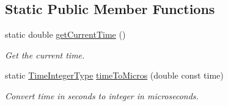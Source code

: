 \subsection*{Static Public Member Functions}
\begin{DoxyCompactItemize}
\item 
static double \hyperlink{structvt_1_1trace_1_1_trace_lite_ad1d8159d645a3b7047ce3f2e0c080f8d}{get\+Current\+Time} ()
\begin{DoxyCompactList}\small\item\em Get the current time. \end{DoxyCompactList}\item 
static \hyperlink{structvt_1_1trace_1_1_trace_lite_a301955b0e2e8d76ca5974c10be8125c4}{Time\+Integer\+Type} \hyperlink{structvt_1_1trace_1_1_trace_lite_a54f5dd2119d3de0bb5df60d7986ea7aa}{time\+To\+Micros} (double const time)
\begin{DoxyCompactList}\small\item\em Convert time in seconds to integer in microseconds. \end{DoxyCompactList}\end{DoxyCompactItemize}
